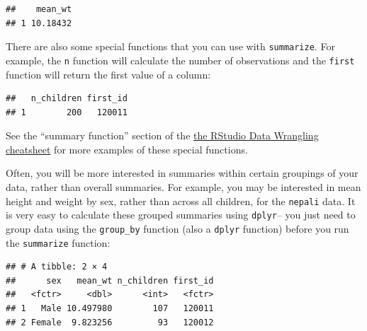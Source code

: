 \documentclass[]{book}
\makeatletter
\newenvironment{Shaded}{\begin{snugshade}}{\end{snugshade}}
\newcommand{\KeywordTok}[1]{\textcolor[rgb]{0.13,0.29,0.53}{\textbf{{#1}}}}
\newcommand{\DataTypeTok}[1]{\textcolor[rgb]{0.13,0.29,0.53}{{#1}}}
\newcommand{\StringTok}[1]{\textcolor[rgb]{0.31,0.60,0.02}{{#1}}}
\newcommand{\OtherTok}[1]{\textcolor[rgb]{0.56,0.35,0.01}{{#1}}}
\newcommand{\NormalTok}[1]{{#1}}
\newenvironment{kframe}{%
\medskip{}
\setlength{\fboxsep}{.8em}
 \def\at@end@of@kframe{}%
 \ifinner\ifhmode%
  \def\at@end@of@kframe{\end{minipage}}%
  \begin{minipage}{\columnwidth}%
 \fi\fi%
 \def\FrameCommand##1{\hskip\@totalleftmargin \hskip-\fboxsep
 \colorbox{shadecolor}{##1}\hskip-\fboxsep
     \hskip-\linewidth \hskip-\@totalleftmargin \hskip\columnwidth}%
 \MakeFramed {\advance\hsize-\width
   \@totalleftmargin\z@ \linewidth\hsize
   \@setminipage}}%
 {\par\unskip\endMakeFramed%
 \at@end@of@kframe}
\renewenvironment{Shaded}{\begin{kframe}}{\end{kframe}}
\makeatother
\begin{document}
\begin{verbatim}
##    mean_wt
## 1 10.18432
\end{verbatim}

There are also some special functions that you can use with
\texttt{summarize}. For example, the \texttt{n} function will calculate
the number of observations and the \texttt{first} function will return
the first value of a column:

\begin{Shaded}
\end{Shaded}

\begin{verbatim}
##   n_children first_id
## 1        200   120011
\end{verbatim}

See the ``summary function'' section of the
\href{https://www.rstudio.com/wp-content/uploads/2015/02/data-wrangling-cheatsheet.pdf}{the
RStudio Data Wrangling cheatsheet} for more examples of these special
functions.

Often, you will be more interested in summaries within certain groupings
of your data, rather than overall summaries. For example, you may be
interested in mean height and weight by sex, rather than across all
children, for the \texttt{nepali} data. It is very easy to calculate
these grouped summaries using \texttt{dplyr}-- you just need to group
data using the \texttt{group\_by} function (also a \texttt{dplyr}
function) before you run the \texttt{summarize} function:

\begin{Shaded}
\end{Shaded}

\begin{verbatim}
## # A tibble: 2 × 4
##      sex   mean_wt n_children first_id
##   <fctr>     <dbl>      <int>   <fctr>
## 1   Male 10.497980        107   120011
## 2 Female  9.823256         93   120012
\end{verbatim}
\end{document}
